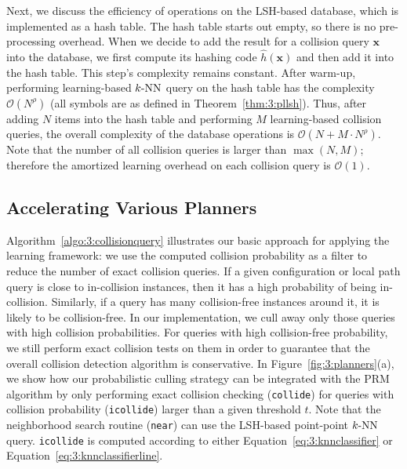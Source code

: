 Next, we discuss the efficiency of operations on the LSH-based database, which is implemented as a hash table. The hash table starts out empty, so there is no pre-processing overhead. When we decide to add the result for a collision query $\mathbf x$ into the database, we first compute its hashing code $\hat{h}(\mathbf x)$ and then add it into the hash table. This step's complexity remains constant. After warm-up, performing learning-based $k\text{-NN}$ query on the hash table has the complexity $\mathcal O(N^{\rho})$ (all symbols are as defined in Theorem~\ref{thm:3:pllsh}). Thus, after adding $N$ items into the hash table and performing $M$ learning-based collision queries, the overall complexity of the database operations is $\mathcal O(N + M \cdot N^{\rho})$. Note that the number of all collision queries is larger than $\max(N, M)$; therefore the amortized learning overhead on each collision query is $\mathcal O(1)$.

\subsection{Accelerating Various Planners}
\label{sec:3:planners:planner}


Algorithm~\ref{algo:3:collisionquery} illustrates our basic approach for applying the learning framework: we use the computed collision probability as a filter to reduce the number of exact collision queries. If a given configuration or local path query is close to in-collision instances, then it has a high probability of being in-collision. Similarly, if a query has many collision-free instances around it, it is likely to be collision-free. In our implementation, we cull away only those queries with high collision probabilities. For queries with high collision-free probability, we still perform exact collision tests on them in order to guarantee that the overall collision detection algorithm is conservative.
In Figure~\ref{fig:3:planners}(a), we show how our probabilistic culling strategy can be integrated with the PRM algorithm by only performing exact collision checking (\texttt{collide}) for queries with collision probability (\texttt{icollide}) larger than a given threshold $t$.
Note that the neighborhood search routine (\texttt{near}) can use the LSH-based point-point $k\text{-NN}$ query. \texttt{icollide} is computed according to either Equation~\ref{eq:3:knnclassifier} or Equation~\ref{eq:3:knnclassifierline}.



